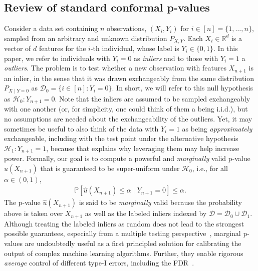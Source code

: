 \documentclass[11pt]{article}
\renewcommand{\P}[1]{\mathbb{P}\left[#1\right]}
\begin{document}
\subsection{Review of standard conformal p-values} \label{sec:standard-conformal}

Consider a data set containing $n$ observations, $(X_i,Y_i)$ for $i \in [n] = \{1,\ldots,n\}$, sampled from an arbitrary and unknown distribution $P_{X,Y}$. Each $X_i \in \mathbb{R}^d$ is a vector of $d$ features for the $i$-th individual, whose label is $Y_i \in \{0,1\}$.
In this paper, we refer to individuals with $Y_i=0$ as {\it inliers} and to those with $Y_i=1$ a {\it outliers}.
The problem is to test whether a new observation with features $X_{n+1}$ is an inlier, in the sense that it was drawn exchangeably from the same distribution $P_{X \mid Y =0}$ as $\mathcal{D}_0 = \{ i \in [n] : Y_i = 0\}$. In short, we will refer to this null hypothesis as $\mathcal{H}_0: Y_{n+1}=0$.
Note that the inliers are assumed to be sampled exchangeably with one another (or, for simplicity, one could think of them a being i.i.d.), but no assumptions are needed about the exchangeability of the outliers.
Yet, it may sometimes be useful to also think of the data with $Y_i=1$ as being {\em approximately} exchangeable, including with the test point under the alternative hypothesis $\mathcal{H}_1: Y_{n+1}=1$, because that explains why leveraging them may help increase power.
Formally, our goal is to compute a powerful and {\em marginally} valid p-value $\hat{u}(X_{n+1})$ that is guaranteed to be super-uniform under $\mathcal{H}_0$, i.e., for all $\alpha \in (0,1)$,
\begin{align} \label{eq:super-uniform}
  \P{\hat{u}(X_{n+1}) \leq \alpha \mid Y_{n+1} = 0} \leq \alpha.
\end{align}
The p-value $\hat{u}(X_{n+1})$ is said to be {\em marginally} valid because the probability above is taken over $X_{n+1}$ as well as the labeled inliers indexed by $\mathcal{D} = \mathcal{D}_0 \cup \mathcal{D}_1$.
Although treating the labeled inliers as random does not lead to the strongest possible guarantees, especially from a multiple testing perspective~\cite{bates2021testing}, marginal p-values are undoubtedly useful as a first principled solution for calibrating the output of complex machine learning algorithms. Further, they enable rigorous {\em average} control of different type-I errors, including the FDR~\cite{bates2021testing}.
\end{document}
